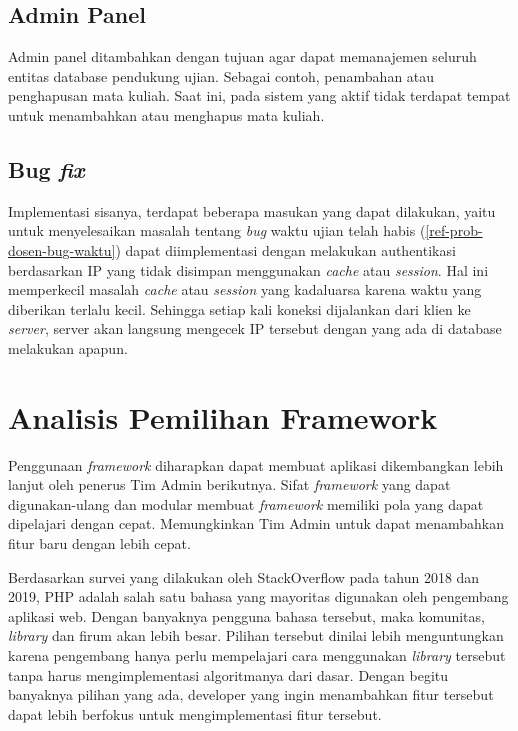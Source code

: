     \subsection{Admin Panel}
        Admin panel ditambahkan dengan tujuan agar dapat memanajemen seluruh entitas database pendukung ujian. Sebagai contoh, penambahan atau penghapusan mata kuliah. Saat ini, pada sistem yang aktif tidak terdapat tempat untuk menambahkan atau menghapus mata kuliah.
    
    \subsection{Bug \textit{fix}}
        Implementasi sisanya, terdapat beberapa masukan yang dapat dilakukan, yaitu untuk menyelesaikan masalah tentang \textit{bug} waktu ujian telah habis (\ref{ref-prob-dosen-bug-waktu}) dapat diimplementasi dengan melakukan authentikasi berdasarkan IP yang tidak disimpan menggunakan \textit{cache} atau \textit{session}. Hal ini memperkecil masalah \textit{cache} atau \textit{session} yang kadaluarsa karena waktu yang diberikan terlalu kecil. Sehingga setiap kali koneksi dijalankan dari klien ke \textit{server}, server akan langsung mengecek IP tersebut dengan yang ada di database melakukan apapun.

\section{Analisis Pemilihan Framework}
Penggunaan \textit{framework} diharapkan dapat membuat aplikasi dikembangkan lebih lanjut oleh penerus Tim Admin berikutnya. Sifat \textit{framework} yang dapat digunakan-ulang dan modular membuat \textit{framework} memiliki pola yang dapat dipelajari dengan cepat.
Memungkinkan Tim Admin untuk dapat menambahkan fitur baru dengan lebih cepat. 

Berdasarkan survei yang dilakukan oleh StackOverflow pada tahun 2018\cite{stackoverflow:survey-2018} dan 2019\cite{stackoverflow:survey-2019}, PHP adalah salah satu bahasa yang mayoritas digunakan oleh pengembang aplikasi web. Dengan banyaknya pengguna bahasa tersebut, maka komunitas, \textit{library} dan firum akan lebih besar. Pilihan tersebut dinilai lebih menguntungkan karena pengembang hanya perlu mempelajari cara menggunakan \textit{library} tersebut tanpa harus mengimplementasi algoritmanya dari dasar. Dengan begitu banyaknya pilihan yang ada, developer yang ingin menambahkan fitur tersebut dapat lebih berfokus untuk mengimplementasi fitur tersebut.

